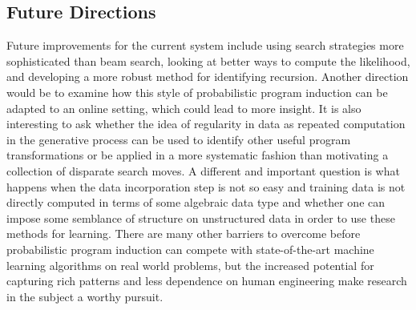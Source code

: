 \documentclass[a4paper,10pt]{article}
\begin{document}
\subsection{Future Directions}
Future improvements for the current system include using search strategies more sophisticated than beam search, looking at better ways to compute the likelihood, and developing a more robust method for identifying recursion.  Another direction would be to examine how this style of probabilistic program induction can be adapted to an online setting, which could lead to more insight.  It is also interesting to ask whether the idea of regularity in data as repeated computation in the generative process can be used to identify other useful program transformations or be applied in a more systematic fashion than motivating a collection of disparate search moves.  A different and important question is what happens when the data incorporation step is not so easy and training data is not directly computed in terms of some algebraic data type and whether one can impose some semblance of structure on unstructured data in order to use these methods for learning.  There are many other barriers to overcome before probabilistic program induction can compete with state-of-the-art machine learning algorithms on real world problems, but the increased potential for capturing rich patterns and less dependence on human engineering make research in the subject a worthy pursuit.


\end{document}
